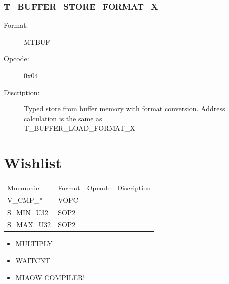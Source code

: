 \documentclass{article}
\begin{document}
\subsubsection{T\_BUFFER\_STORE\_FORMAT\_X}
\begin{description}
  \item[Format:] MTBUF
  \item[Opcode:] 0x04
  \item[Discription:] Typed store from buffer memory with format conversion. Address calculation is the same as \\T\_BUFFER\_LOAD\_FORMAT\_X
\end{description}

\section{Wishlist}
\begin{tabular}{l l l p{4.5in}}
Mnemonic & Format & Opcode & Discription \\
V\_CMP\_* & VOPC &  \\
S\_MIN\_U32 & SOP2 &  \\
S\_MAX\_U32 & SOP2 &  \\
\end{tabular}
\begin{itemize}
\item MULTIPLY 
\item WAITCNT 
\item MIAOW COMPILER!
\end{itemize}
\end{document}
